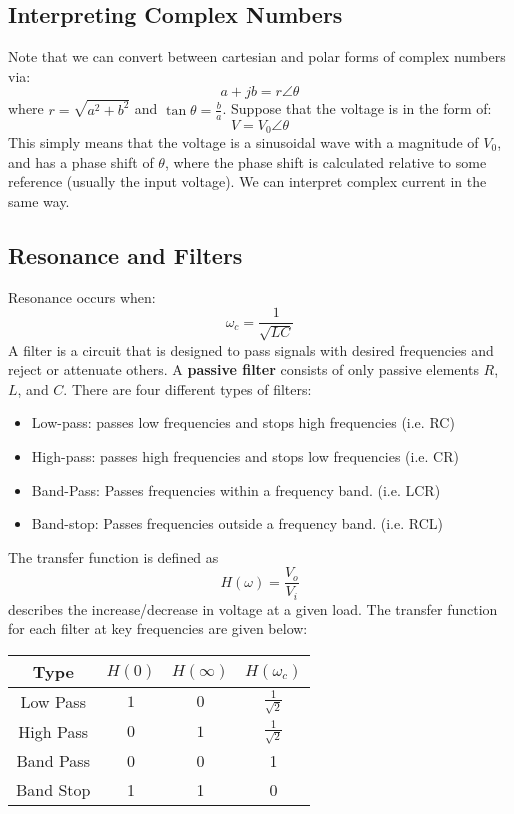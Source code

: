 \documentclass{article}
\begin{document}
\subsection{Interpreting Complex Numbers}
Note that we can convert between cartesian and polar forms of complex numbers via:
\begin{equation}
    a + jb = r \angle \theta
\end{equation}
where $r = \sqrt{a^2+b^2}$ and $\tan\theta = \frac{b}{a}$. Suppose that the voltage is in the form of:
\begin{equation}
    V = V_0 \angle \theta
\end{equation}
This simply means that the voltage is a sinusoidal wave with a magnitude of $V_0$, and has a phase shift of $\theta$, where the phase shift is calculated relative to some reference (usually the input voltage). We can interpret complex current in the same way.
\subsection{Resonance and Filters}
Resonance occurs when:
\begin{equation}
    \omega_c = \frac{1}{\sqrt{LC}}
\end{equation}
A filter is a circuit that is designed to pass signals with desired frequencies and reject or attenuate others. A \textbf{passive filter} consists of only passive elements $R$, $L$, and $C$. There are four different types of filters:
\begin{itemize}
    \item Low-pass: passes low frequencies and stops high frequencies (i.e. RC)
    \item High-pass: passes high frequencies and stops low frequencies (i.e. CR)
    \item Band-Pass: Passes frequencies within a frequency band. (i.e. LCR)
    \item Band-stop: Passes frequencies outside a frequency band. (i.e. RCL)
\end{itemize}
The transfer function is defined as
\begin{equation}
    H(\omega) = \frac{V_o}{V_i}
\end{equation}
describes the increase/decrease in voltage at a given load. The transfer function for each filter at key frequencies are given below:
\begin{center}
    \begin{tabular}{|c|c|c|c|}
        \hline
        Type      & $H(0)$ & $H(\infty)$ & $H(\omega_c)$        \\ \hline
        Low Pass  & $1$    & $0$         & $\frac{1}{\sqrt{2}}$ \\ \hline
        High Pass & $0$    & $1$         & $\frac{1}{\sqrt{2}}$ \\ \hline
        Band Pass & 0      & 0           & 1                    \\ \hline
        Band Stop & 1      & 1           & 0                    \\ \hline
        \end{tabular}
\end{center}
\end{document}
